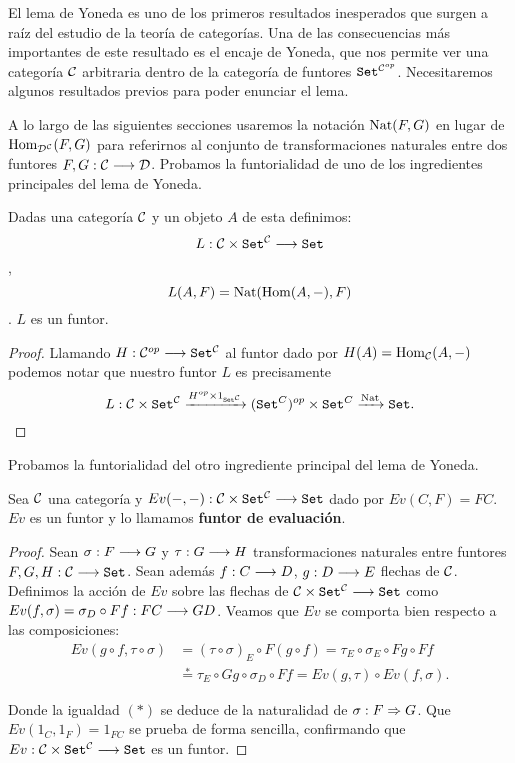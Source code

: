 El lema de Yoneda es uno de los primeros resultados
inesperados que surgen a raíz del
estudio de la teoría de categorías. Una
de las consecuencias más importantes de este resultado es
el encaje de Yoneda, que nos permite
ver una categoría $\mathcal{C}$ arbitraria dentro de la categoría de
funtores $\texttt{Set}^{\mathcal{C}^{op}}$. Necesitaremos algunos resultados
previos para poder enunciar el lema.

A lo largo de las siguientes
secciones usaremos la notación $\operatorname{Nat}(F, G)$ en lugar de
$\operatorname{Hom}_{\mathcal{D}^{\mathcal{C}}}(F, G)$ para referirnos al conjunto de
transformaciones naturales entre dos funtores
$F, G: \mathcal{C}\longrightarrow \mathcal{D}$. Probamos la funtorialidad de uno de los
ingredientes principales del lema de Yoneda.
\begin{proposition*}
  Dadas una categoría $\mathcal{C}$ y un objeto $A$ de esta definimos:
  $$L : \mathcal{C}\times\texttt{Set}^{\mathcal{C}}\longrightarrow \texttt{Set}$$,
  $$L(A, F) = \operatorname{Nat}(\operatorname{Hom}(A, -), F)$$.
  $L$ es un funtor.
\end{proposition*}
\begin{proof}
  Llamando
  $H: \mathcal{C}^{op}\longrightarrow \texttt{Set}^{\mathcal{C}}$ al funtor dado por
  $H(A) = \operatorname{Hom}_{\mathcal{C}}(A, -)$
  podemos notar que nuestro funtor $L$ es precisamente
  $$L :\mathcal{C}\times\texttt{Set}^{\mathcal{C}}
  \xrightarrow{H^{op}\times 1_{\texttt{Set}^{\mathcal{C}}}}
  (\texttt{Set}^{C})^{op} \times \texttt{Set}^{C}
  \xrightarrow{\operatorname{Nat}} \texttt{Set}.\qedhere$$
\end{proof}
Probamos la funtorialidad
del otro ingrediente principal del lema de Yoneda.
\begin{proposition*}
  Sea $\mathcal{C}$ una categoría y $Ev(-, -) : \mathcal{C}\times\texttt{Set}^{\mathcal{C}}\longrightarrow \texttt{Set}$
  dado por $Ev(C, F) = FC$. $Ev$ es un funtor y lo llamamos
  \textbf{funtor de evaluación}.
\end{proposition*}
\begin{proof}
  Sean $\sigma : F\longrightarrow G$ y $\tau : G\longrightarrow H$ transformaciones naturales entre funtores
  $F, G, H : \mathcal{C}\longrightarrow \texttt{Set}$. Sean además $f : C\longrightarrow D$,
  $g : D\longrightarrow E$ flechas de $\mathcal{C}$.
  Definimos la acción de $Ev$ sobre las flechas de
  $\mathcal{C}\times\texttt{Set}^{\mathcal{C}}\longrightarrow \texttt{Set}$ como
  $Ev(f, \sigma) = \sigma_D \circ Ff : FC\longrightarrow GD$. Veamos que $Ev$ se comporta bien
  respecto a las composiciones:
  \begin{align*}
    Ev(g \circ f, \tau\circ\sigma) &
     = (\tau \circ \sigma)_E\circ F(g\circ f)
     = \tau_E\circ\sigma_E\circ Fg \circ Ff \\
     & \stackrel{*}{=}
  \tau_E\circ Gg \circ\sigma_D \circ Ff
  = Ev(g, \tau) \circ Ev(f, \sigma).
  \end{align*}

  Donde la igualdad $(*)$ se deduce de la
  naturalidad de $\sigma : F\Rightarrow G$.
  Que $Ev(1_C, 1_F) = 1_{FC}$ se prueba de forma sencilla,
  confirmando que $Ev : \mathcal{C}\times\texttt{Set}^{\mathcal{C}}\longrightarrow \texttt{Set}$ es un funtor.
\end{proof}

